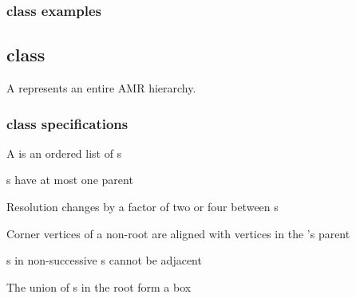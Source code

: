 \documentclass[11pt]{article}
\begin{document}
\subsubsection{ class examples} \label{sss:level-usecases}


\subsection{ class} \label{ss:hierarchy}

A  represents an entire AMR hierarchy.

\subsubsection{ class specifications} \label{sss:hierarchy-specifications}


\BeginENUMERATE
\item A  is an ordered list of s
\item {}s have at most one parent
\item Resolution changes by a factor of two or four between  s
\item Corner vertices of a non-root  are aligned with vertices in the 's parent
\item {}s in non-successive s cannot be adjacent
\item The union of s in the root  form a box
\EndENUMERATE
\end{document}
